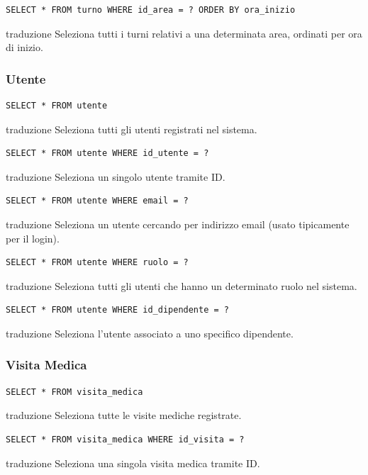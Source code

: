 \documentclass[12pt,a4paper]{report}
\begin{document}
\begin{lstlisting}[style=sqlstyle]
SELECT * FROM turno WHERE id_area = ? ORDER BY ora_inizio
\end{lstlisting}
traduzione {Seleziona tutti i turni relativi a una determinata area, ordinati per ora di inizio.}

\subsubsection*{Utente}
\begin{lstlisting}[style=sqlstyle]
SELECT * FROM utente
\end{lstlisting}
traduzione {Seleziona tutti gli utenti registrati nel sistema.}

\begin{lstlisting}[style=sqlstyle]
SELECT * FROM utente WHERE id_utente = ?
\end{lstlisting}
traduzione {Seleziona un singolo utente tramite ID.}

\begin{lstlisting}[style=sqlstyle]
SELECT * FROM utente WHERE email = ?
\end{lstlisting}
traduzione {Seleziona un utente cercando per indirizzo email (usato tipicamente per il login).}

\begin{lstlisting}[style=sqlstyle]
SELECT * FROM utente WHERE ruolo = ?
\end{lstlisting}
traduzione {Seleziona tutti gli utenti che hanno un determinato ruolo nel sistema.}

\begin{lstlisting}[style=sqlstyle]
SELECT * FROM utente WHERE id_dipendente = ?
\end{lstlisting}
traduzione {Seleziona l'utente associato a uno specifico dipendente.}

\subsubsection*{Visita Medica}
\begin{lstlisting}[style=sqlstyle]
SELECT * FROM visita_medica
\end{lstlisting}
traduzione {Seleziona tutte le visite mediche registrate.}

\begin{lstlisting}[style=sqlstyle]
SELECT * FROM visita_medica WHERE id_visita = ?
\end{lstlisting}
traduzione {Seleziona una singola visita medica tramite ID.}
\end{document}

